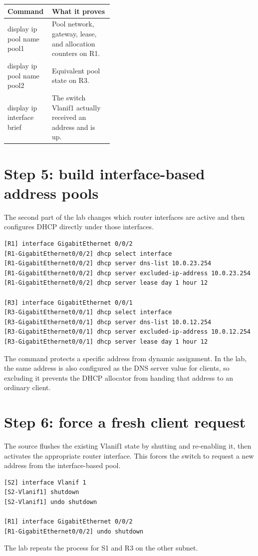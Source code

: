 \begin{commandmap}
\begin{tabularx}{\linewidth}{>{\ttfamily}p{0.42\linewidth}X}
\toprule
Command & What it proves\\\midrule
 display ip pool name pool1 & Pool network, gateway, lease, and allocation counters on R1.\\
 display ip pool name pool2 & Equivalent pool state on R3.\\
 display ip interface brief & The switch Vlanif1 actually received an address and is up.\\\bottomrule
\end{tabularx}
\end{commandmap}

\section{Step 5: build interface-based address pools}
The second part of the lab changes which router interfaces are active and then configures DHCP directly under those interfaces.
\begin{lstlisting}[style=dcnterminal]
[R1] interface GigabitEthernet 0/0/2
[R1-GigabitEthernet0/0/2] dhcp select interface
[R1-GigabitEthernet0/0/2] dhcp server dns-list 10.0.23.254
[R1-GigabitEthernet0/0/2] dhcp server excluded-ip-address 10.0.23.254
[R1-GigabitEthernet0/0/2] dhcp server lease day 1 hour 12

[R3] interface GigabitEthernet 0/0/1
[R3-GigabitEthernet0/0/1] dhcp select interface
[R3-GigabitEthernet0/0/1] dhcp server dns-list 10.0.12.254
[R3-GigabitEthernet0/0/1] dhcp server excluded-ip-address 10.0.12.254
[R3-GigabitEthernet0/0/1] dhcp server lease day 1 hour 12
\end{lstlisting}

\begin{keyidea}
The  command protects a specific address from dynamic assignment. In the lab, the same address is also configured as the DNS server value for clients, so excluding it prevents the DHCP allocator from handing that address to an ordinary client.
\end{keyidea}

\section{Step 6: force a fresh client request}
The source flushes the existing Vlanif1 state by shutting and re-enabling it, then activates the appropriate router interface. This forces the switch to request a new address from the interface-based pool.
\begin{lstlisting}[style=dcnterminal]
[S2] interface Vlanif 1
[S2-Vlanif1] shutdown
[S2-Vlanif1] undo shutdown

[R1] interface GigabitEthernet 0/0/2
[R1-GigabitEthernet0/0/2] undo shutdown
\end{lstlisting}
The lab repeats the process for S1 and R3 on the other subnet.

